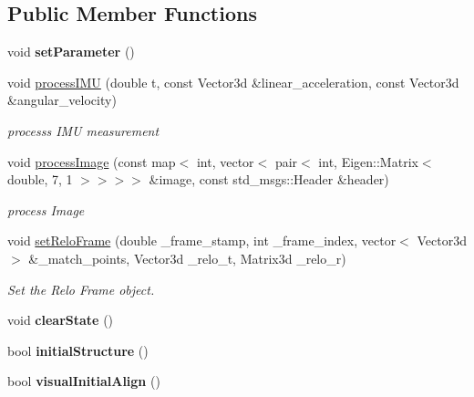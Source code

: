 \subsection*{Public Member Functions}
\begin{DoxyCompactItemize}
\item 
\mbox{\label{classEstimator_a38f16d396fade5dee487db958d8f45da}} 
void {\bfseries set\+Parameter} ()
\item 
void \hyperlink{classEstimator_aa44c20668ac637af041152abd568fe81}{process\+I\+MU} (double t, const Vector3d \&linear\+\_\+acceleration, const Vector3d \&angular\+\_\+velocity)
\begin{DoxyCompactList}\small\item\em processs I\+MU measurement \end{DoxyCompactList}\item 
void \hyperlink{classEstimator_aa6fb65bc801f80dc142e3a5f9d0109ee}{process\+Image} (const map$<$ int, vector$<$ pair$<$ int, Eigen\+::\+Matrix$<$ double, 7, 1 $>$$>$$>$$>$ \&image, const std\+\_\+msgs\+::\+Header \&header)
\begin{DoxyCompactList}\small\item\em process Image \end{DoxyCompactList}\item 
void \hyperlink{classEstimator_a13444b276377b490d799bad3a21c8bf9}{set\+Relo\+Frame} (double \+\_\+frame\+\_\+stamp, int \+\_\+frame\+\_\+index, vector$<$ Vector3d $>$ \&\+\_\+match\+\_\+points, Vector3d \+\_\+relo\+\_\+t, Matrix3d \+\_\+relo\+\_\+r)
\begin{DoxyCompactList}\small\item\em Set the Relo Frame object. \end{DoxyCompactList}\item 
\mbox{\label{classEstimator_afd9366e076daf96e28a3b2b419a7b3ba}} 
void {\bfseries clear\+State} ()
\item 
\mbox{\label{classEstimator_a6da34743ac07ff0be15d58cfbe9ea9f1}} 
bool {\bfseries initial\+Structure} ()
\item 
\mbox{\label{classEstimator_af34f289f486b9d1e75ba83cae20980a7}} 
bool {\bfseries visual\+Initial\+Align} ()
\item 
\mbox{\label{classEstimator_a60ff51cc613465e06360f12966c7e1b5}} 
$$
\end{DoxyCompactItemize}
